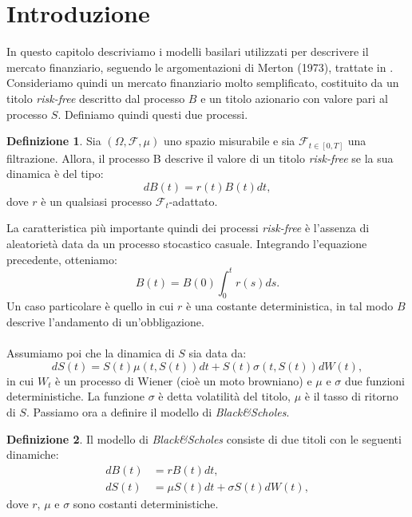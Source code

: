 \documentclass[a4paper,10pt]{report}
\theoremstyle{plain}
\theoremstyle{definition}
\newtheorem{definition}{Definizione}[chapter]
\theoremstyle{remark}
\newtheorem{osservazione}{Osservazione}[chapter]
\begin{document}
\section{Introduzione}
In questo capitolo descriviamo i modelli basilari utilizzati per descrivere il mercato finanziario, seguendo le argomentazioni di Merton (1973), trattate in \cite{bjork2009arbitrage}. Consideriamo quindi un mercato finanziario molto semplificato, costituito da un titolo \emph{risk-free} descritto dal processo $B$ e un titolo azionario con valore pari al processo $S$. Definiamo quindi questi due processi.
\begin{definition}
Sia $(\Omega,\mathcal{F},\mu)$ uno spazio misurabile e sia $\mathcal{F}_{t\in [ 0,T ]}$ una filtrazione. Allora, il processo B descrive il valore di un titolo \emph{risk-free} se la sua dinamica \`e del tipo: $$dB(t)=r(t)B(t)dt,$$dove $r$ \`e un qualsiasi processo $\mathcal{F}_t$-adattato.
\end{definition}
La caratteristica pi\`u importante quindi dei processi \emph{risk-free} \`e l'assenza di aleatoriet\`a data da un processo stocastico casuale. Integrando l'equazione precedente, otteniamo: $$B(t)=B(0)\int_0^tr(s)ds.$$ Un caso particolare \`e quello in cui $r$ \`e una costante deterministica, in tal modo $B$ descrive l'andamento di un'obbligazione.\\\\Assumiamo poi che la dinamica di $S$ sia data da: $$dS(t)=S(t)\mu(t,S(t))dt+S(t)\sigma(t,S(t))dW(t),$$ in cui $W_t$ \`e un processo di Wiener (cio\`e un moto browniano) e $\mu$ e $\sigma$ due funzioni deterministiche. La funzione $\sigma$ \`e detta volatilit\`a del titolo, $\mu$ \`e il tasso di ritorno di $S$.
Passiamo ora a definire il modello di \emph{Black\&Scholes}.
\begin{definition}
Il modello di \emph{Black\&Scholes} consiste di due titoli con le seguenti dinamiche:
\begin{align*}
dB(t)&=rB(t)dt,\\
dS(t)&=\mu S(t)dt+\sigma S(t)dW(t),
\end{align*}
dove $r$, $\mu$ e $\sigma$ sono costanti deterministiche.
\end{definition}
\end{document}
